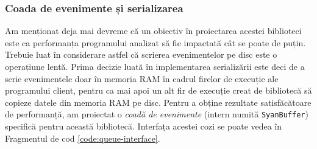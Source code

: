 \subsubsection{Coada de evenimente și serializarea}\label{section:queue}

Am menționat deja mai devreme că un obiectiv în proiectarea acestei
biblioteci este ca performanța programului analizat să fie impactată cât
se poate de puțin. Trebuie luat în considerare astfel că scrierea
evenimentelor pe disc este o operațiune lentă. Prima decizie luată în
implementarea serializării este deci de a scrie evenimentele doar în
memoria RAM în cadrul firelor de execuție ale programului client, pentru
ca mai apoi un alt fir de execuție creat de bibliotecă să copieze datele
din memoria RAM pe disc. Pentru a obține rezultate satisfăcătoare de
performanță, am proiectat o \textit{coadă de evenimente} (intern numită
\lstinline{SyanBuffer}) specifică pentru această bibliotecă. Interfața
acestei cozi se poate vedea în Fragmentul de cod
\ref{code:queue-interface}.

